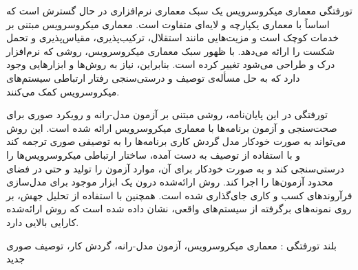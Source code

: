 


‌تورفتگی
معماری میکروسرویس یک سبک معماری نرم‌افزاری در حال گسترش است که اساساً با معماری یکپارچه و لایه‌ای متفاوت است. معماری میکروسرویس مبتنی بر خدمات کوچک است و مزیت‌هایی مانند استقلال، ترکیب‌پذیری، مقیاس‌پذیری و تحمل شکست را ارائه می‌دهد. با ظهور سبک معماری میکروسرویس، روشی که نرم‌افزار درک و طراحی می‌شود تغییر کرده است. بنابراین، نیاز به روش‌ها و ابزارهایی وجود دارد که به حل مسأله‌ی توصیف و درستی‌سنجی رفتار ارتباطی سیستم‌های میکروسرویس کمک می‌کنند. 

‌تورفتگی
در این پایان‌نامه، روشی مبتنی بر آزمون مدل-رانه و رویکرد صوری برای صحت‌سنجی و آزمون برنامه‌ها با معماری میکروسرویس ارائه شده است. این روش می‌تواند به صورت خودکار مدل گردش کاری برنامه‌ها را به توصیفی صوری ترجمه کند و با استفاده از توصیف به دست آمده، ساختار ارتباطی میکروسرویس‌ها را درستی‌سنجی کند و به صورت خودکار برای آن، موارد آزمون را تولید و حتی در فضای محدود آزمون‌ها را اجرا کند. روش ارائه‌شده‌ درون یک ابزار موجود برای مدل‌سازی فرآروندهای کسب و کاری جای‌گذاری شده است. همچنین با استفاده از تحلیل جهش، بر روی نمونه‌های برگرفته از سیستم‌های واقعی، نشان داده شده‌ است که روش ارائه‌شده کارایی بالایی دارد.



‌بلند
‌تورفتگی : 
معماری میکروسرویس، آزمون مدل-رانه، گردش کار، توصیف صوری
‌جدید
